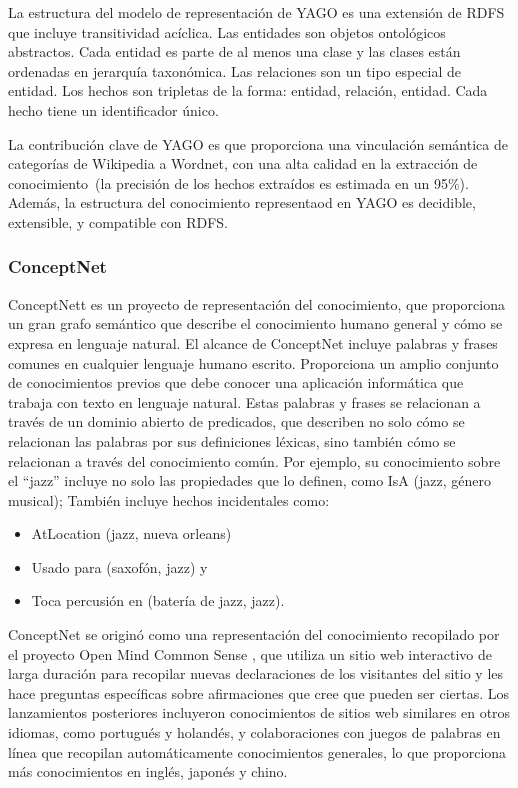 La estructura del modelo de representación de YAGO es una extensión de RDFS que incluye transitividad acíclica.
Las entidades son objetos ontológicos abstractos.
Cada entidad es parte de al menos una clase y las clases están ordenadas en jerarquía taxonómica.
Las relaciones son un tipo especial de entidad.
Los hechos son tripletas de la forma: entidad, relación, entidad.
Cada hecho tiene un identificador único.

La contribución clave de YAGO es que proporciona una vinculación semántica de categorías de Wikipedia a Wordnet, con una alta calidad en la extracción de conocimiento~(la precisión de los hechos extraídos es estimada en un 95\%).
Además, la estructura del conocimiento representaod en YAGO es decidible, extensible, y compatible con RDFS.

\subsubsection*{ConceptNet}

ConceptNett es un proyecto de representación del conocimiento, que proporciona un gran grafo semántico que describe el conocimiento humano general y cómo se expresa en lenguaje natural.
El alcance de ConceptNet incluye palabras y frases comunes en cualquier lenguaje humano escrito.
Proporciona un amplio conjunto de conocimientos previos que debe conocer una aplicación informática que trabaja con texto en lenguaje natural.
Estas palabras y frases se relacionan a través de un dominio abierto de predicados, que describen no solo cómo se relacionan las palabras por sus definiciones léxicas, sino también cómo se relacionan a través del conocimiento común.
Por ejemplo, su conocimiento sobre el “jazz” incluye no solo las propiedades que lo definen, como IsA (jazz, género musical); También incluye hechos incidentales como:
\begin{itemize}
  \item AtLocation (jazz, nueva orleans)
  \item Usado para (saxofón, jazz) y
  \item Toca percusión en (batería de jazz, jazz).
\end{itemize}

ConceptNet se originó como una representación del conocimiento recopilado por el proyecto Open Mind Common Sense \cite{Singh2002}, que utiliza un sitio web interactivo de larga duración para recopilar nuevas declaraciones de los visitantes del sitio y les hace preguntas específicas sobre afirmaciones que cree que pueden ser ciertas.
Los lanzamientos posteriores incluyeron conocimientos de sitios web similares en otros idiomas, como portugués y holandés, y colaboraciones con juegos de palabras en línea que recopilan automáticamente conocimientos generales, lo que proporciona más conocimientos en inglés, japonés y chino.

